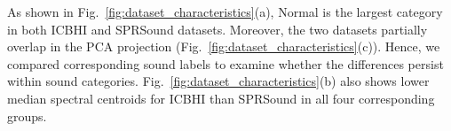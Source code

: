 As shown in Fig.~\ref{fig:dataset_characteristics}(a), Normal is the largest category in both ICBHI and SPRSound datasets. Moreover, the two datasets partially overlap in the PCA projection (Fig.~\ref{fig:dataset_characteristics}(c)). Hence, we compared corresponding sound labels to examine whether the differences persist within sound categories. Fig.~\ref{fig:dataset_characteristics}(b) also shows lower median spectral centroids for ICBHI than SPRSound in all four corresponding groups.%